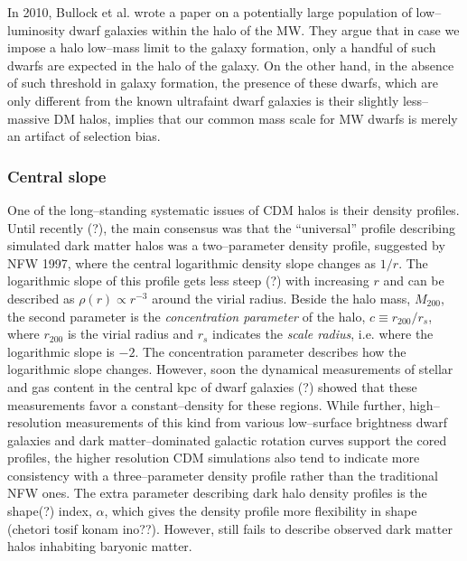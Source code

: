 \documentclass[paper=a4, fontsize=11pt]{scrartcl} %
\numberwithin{equation}{section} %
\numberwithin{figure}{section} %
\numberwithin{table}{section} %
\begin{document}
In 2010, Bullock et al. wrote a paper on a potentially large population of low--luminosity dwarf galaxies within the halo of the MW. They argue that in case we impose a halo low--mass limit to the galaxy formation, only a handful of such dwarfs are expected in the halo of the galaxy. On the other hand, in the absence of such threshold in galaxy formation, the presence of these dwarfs, which are only different from the known ultrafaint dwarf galaxies is their slightly less--massive DM halos, implies that our common mass scale for MW dwarfs is merely an artifact of selection bias. 
 
\subsubsection{Central slope}
One of the long--standing systematic issues of CDM halos is their density profiles. Until recently (?), the main consensus was that the ``universal'' profile describing simulated dark matter halos was a two--parameter density profile, suggested by NFW 1997, where the central logarithmic density slope changes as $1/r$. The logarithmic slope of this profile gets less steep (?) with increasing $r$ and can be described as $\rho(r) \propto r^{-3}$ around the virial radius. Beside the halo mass, $M_{200}$, the second parameter is the \emph{concentration parameter} of the halo, $c \equiv r_{200}/r_s$, where $r_{200}$ is the virial radius and $r_s$ indicates the \emph{scale radius}, i.e. where the logarithmic slope is $-2$. The concentration parameter describes how the logarithmic slope changes. However, soon the dynamical measurements of stellar and gas content in the central kpc of dwarf galaxies (?) showed that these measurements favor a constant--density for these regions. While further, high--resolution measurements of this kind from various low--surface brightness dwarf galaxies and dark matter--dominated galactic rotation curves support the cored profiles, the higher resolution CDM simulations also tend to indicate more consistency with a three--parameter density profile rather than the traditional NFW ones. The extra parameter describing dark halo density profiles is the shape(?) index, $\alpha$, which gives the density profile more flexibility in shape (chetori tosif konam ino??). However, still fails to describe observed dark matter halos inhabiting baryonic matter. 
\end{document}
